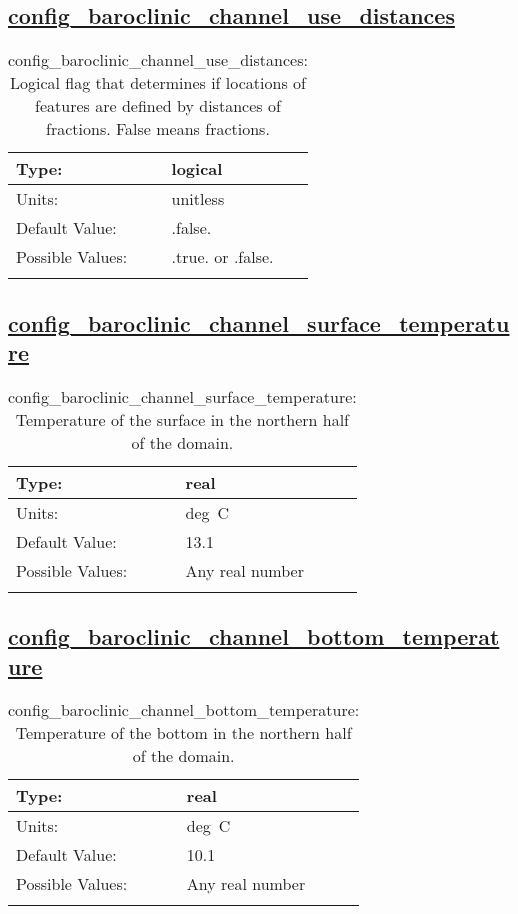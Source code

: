 \subsection[config\_baroclinic\_channel\_use\_distances]{\hyperref[sec:nm_tab_baroclinic_channel]{config\_baroclinic\_channel\_use\_distances}}
\label{subsec:nm_sec_config_baroclinic_channel_use_distances}
\begin{center}
\begin{longtable}{| p{2.0in} || p{4.0in} |}
    \hline
    Type: & logical \\
    \hline
    Units: & \si{unitless} \\
    \hline
    Default Value: & .false. \\
    \hline
    Possible Values: & .true. or .false. \\
    \hline
    \caption{config\_baroclinic\_channel\_use\_distances: Logical flag that determines if locations of features are defined by distances of fractions. False means fractions.}
\end{longtable}
\end{center}
\subsection[config\_baroclinic\_channel\_surface\_temperature]{\hyperref[sec:nm_tab_baroclinic_channel]{config\_baroclinic\_channel\_surface\_temperature}}
\label{subsec:nm_sec_config_baroclinic_channel_surface_temperature}
\begin{center}
\begin{longtable}{| p{2.0in} || p{4.0in} |}
    \hline
    Type: & real \\
    \hline
    Units: & \si{deg.C} \\
    \hline
    Default Value: & 13.1 \\
    \hline
    Possible Values: & Any real number \\
    \hline
    \caption{config\_baroclinic\_channel\_surface\_temperature: Temperature of the surface in the northern half of the domain.}
\end{longtable}
\end{center}
\subsection[config\_baroclinic\_channel\_bottom\_temperature]{\hyperref[sec:nm_tab_baroclinic_channel]{config\_baroclinic\_channel\_bottom\_temperature}}
\label{subsec:nm_sec_config_baroclinic_channel_bottom_temperature}
\begin{center}
\begin{longtable}{| p{2.0in} || p{4.0in} |}
    \hline
    Type: & real \\
    \hline
    Units: & \si{deg.C} \\
    \hline
    Default Value: & 10.1 \\
    \hline
    Possible Values: & Any real number \\
    \hline
    \caption{config\_baroclinic\_channel\_bottom\_temperature: Temperature of the bottom in the northern half of the domain.}
\end{longtable}
\end{center}
